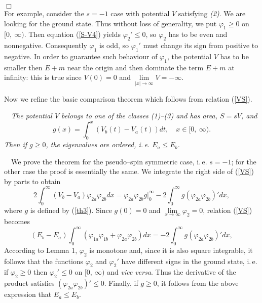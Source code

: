 \documentclass[amsmath,amssymb,superscriptaddress,showkeys, showpacs, aps, nofootinbib]{revtex4}
\begin{document}
\hfill $\Box$\\

For example, consider the $s=-1$ case with potential $V$ satisfying {\it(2)}. We are looking for the ground state. Thus without loss of generality, we put $\varphi_1\ge 0$ on $[0,\ \infty)$. Then equation (\ref{S-V4}) yields $\varphi_{2}'\le 0$, so $\varphi_2$ has to be even and nonnegative. Consequently $\varphi_1$ is odd, so $\varphi_1'$ must change its sign from positive to negative. In order to guarantee such behaviour of $\varphi_1$, the potential $V$ has to be smaller then $E+m$ near the origin and then dominate the term $E+m$ at infinity: this is true since $V(0)=0$ and $\lim\limits_{|x|\to\infty}V=-\infty$.

Now we refine the basic comparison theorem which follows from relation (\ref{VS}). 

\medskip

 ~~{\it The potential $V$  belongs to one of the classes (1)--(3) and has area, $S=sV$, and
\begin{equation}\label{th3}
g(x)=\int_0^x (V_b(t)-V_a(t))dt, \quad x\in[0,\ \infty).
\end{equation}
Then if $g\ge 0$, the eigenvalues are ordered, i.\,e. $E_a\le E_b$.} 

\medskip

 ~~We prove the theorem for the pseudo--spin symmetric case, i.\,e. $s=-1$; for the other case the proof is essentially the same. We integrate the right side of (\ref{VS}) by parts to obtain
\begin{equation*}
2\int_0^\infty (V_b-V_a)\varphi_{2a}\varphi_{2b}dx=\varphi_{2a}\varphi_{2b}g|_0^\infty -2\int_0^\infty g\left(\varphi_{2a}\varphi_{2b}\right)'dx,
\end{equation*}
where $g$ is defined by (\ref{th3}). Since $g(0)=0$ and $\lim\limits_{x\to\infty}\varphi_2=0$, relation (\ref{VS}) becomes
\begin{equation*}
(E_b-E_a)\int_0^\infty (\varphi_{1a}\varphi_{1b}+\varphi_{2a}\varphi_{2b})dx=
-2\int_0^\infty g\left(\varphi_{2a}\varphi_{2b}\right)'dx,
\end{equation*}
According to Lemma 1, $\varphi_2$ is monotone and, since it is also square integrable, it follows that the functions $\varphi_2$ and $\varphi_2'$ have different signs in the ground state, i.\,e. if $\varphi_2\ge 0$ then $\varphi_2'\le 0$ on $[0,\ \infty)$ and {\it vice versa}. Thus the derivative of the product satisfies $\left(\varphi_{2a}\varphi_{2b}\right)'\le 0$. Finally, if $g\ge 0$, it follows from the above expression that $E_a\le E_b$.
\end{document}

